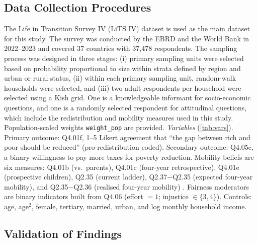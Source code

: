 \documentclass[11pt,a4paper]{article}
\begin{document}
\subsection{Data Collection Procedures}

The Life in Transition Survey IV (LiTS IV) dataset \citep{ebrd2024lits} is used as the
main dataset for this study. The survey was conducted by the EBRD and the World Bank in
2022--2023 and covered 37 countries with 37{,}478 respondents. The sampling process was
designed in three stages: (i) primary sampling units were selected based on probability
proportional to size within strata defined by region and urban or rural status, (ii)
within each primary sampling unit, random-walk households were selected, and (iii) two
adult respondents per household were selected using a Kish grid. One is a knowledgeable
informant for socio-economic questions, and one is a randomly selected respondent for
attitudinal questions, which include the redistribution and mobility measures used in
this study. Population-scaled weights \texttt{weight\_pop} are provided.
\emph{Variables} (\cref{tab:vars}). Primary outcome: Q4.01f, 1--5 Likert agreement that ``the gap between
rich and poor should be reduced'' (pro-redistribution coded). Secondary outcome: Q4.05e,
a binary willingness to pay more taxes for poverty reduction. Mobility beliefs are six
measures: Q4.01b (vs.\ parents), Q4.01c (four-year retrospective), Q4.01e (prospective
children), Q2.35 (current ladder), Q2.37$-$Q2.35 (expected four-year mobility), and
Q2.35$-$Q2.36 (realised four-year mobility) \citep{cantril1965pattern, deaton2008income}.
Fairness moderators are binary indicators built from Q4.06 (effort $=1$; injustice
$\in\{3,4\}$). Controls: age, age$^2$, female, tertiary, married, urban, and log
monthly household income.


\subsection{Validation of Findings}
\end{document}

